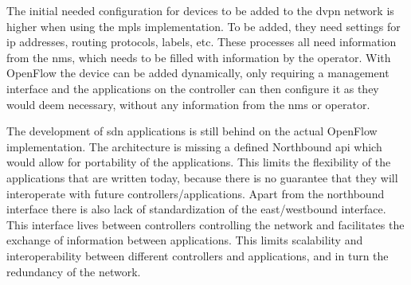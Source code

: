 The initial needed configuration for devices to be added to the \ac{dvpn} network is higher when using the \ac{mpls} implementation. To be added, they need settings for \ac{ip} addresses, routing protocols, labels, etc. These processes all need information from the \ac{nms}, which needs to be filled with information by the operator. With OpenFlow the device can be added dynamically, only requiring a management interface and the applications on the controller can then configure it as they would deem necessary, without any information from the \ac{nms} or operator.

The development of \ac{sdn} applications is still behind on the actual OpenFlow implementation. The architecture is missing a defined Northbound \ac{api} which would allow for portability of the applications. This limits the flexibility of the applications that are written today, because there is no guarantee that they will interoperate with future controllers/applications. Apart from the northbound interface there is also lack of standardization of the east/westbound interface. This interface lives between controllers controlling the network and facilitates the exchange of information between applications. This limits scalability and interoperability between different controllers and applications, and in turn the redundancy of the network.




